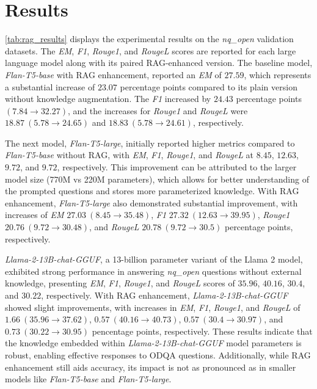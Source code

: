 \section{Results}



\cref{tab:rag_results} displays the experimental results on the \emph{nq\_open} validation datasets. The \emph{EM}, \emph{F1}, \emph{Rouge1}, and \emph{RougeL} scores are reported for each large language model along with its paired RAG-enhanced version. The baseline model, \emph{Flan-T5-base} with RAG enhancement, reported an \emph{EM} of $27.59$, which represents a substantial increase of $23.07$ percentage points compared to its plain version without knowledge augmentation. The \emph{F1} increased by $24.43$ percentage points $(7.84 \rightarrow 32.27)$, and the increases for \emph{Rouge1} and \emph{RougeL} were $18.87~(5.78 \rightarrow 24.65)$ and $18.83 ~(5.78 \rightarrow 24.61)$, respectively.

The next model, \emph{Flan-T5-large}, initially reported higher metrics compared to \emph{Flan-T5-base} without RAG, with \emph{EM}, \emph{F1}, \emph{Rouge1}, and \emph{RougeL} at $8.45$, $12.63$, $9.72$, and $9.72$, respectively. This improvement can be attributed to the larger model size (770M vs 220M parameters), which allows for better understanding of the prompted questions and stores more parameterized knowledge. With RAG enhancement, \emph{Flan-T5-large} also demonstrated substantial improvement, with increases of \emph{EM} $27.03~(8.45 \rightarrow 35.48)$, \emph{F1} $27.32~(12.63 \rightarrow 39.95)$, \emph{Rouge1} $20.76~(9.72 \rightarrow 30.48)$, and \emph{RougeL} $20.78~(9.72 \rightarrow 30.5)$ percentage points, respectively.

\emph{Llama-2-13B-chat-GGUF}, a 13-billion parameter variant of the Llama 2 model, exhibited strong performance in answering \emph{nq\_open} questions without external knowledge, presenting \emph{EM}, \emph{F1}, \emph{Rouge1}, and \emph{RougeL} scores of $35.96$, $40.16$, $30.4$, and $30.22$, respectively. With RAG enhancement, \emph{Llama-2-13B-chat-GGUF} showed slight improvements, with increases in \emph{EM}, \emph{F1}, \emph{Rouge1}, and \emph{RougeL} of $1.66~(35.96 \rightarrow 37.62)$, $0.57~(40.16 \rightarrow 40.73)$, $0.57~(30.4 \rightarrow 30.97)$, and $0.73~(30.22 \rightarrow 30.95)$ pencentage points, respectively. These results indicate that the knowledge embedded within \emph{Llama-2-13B-chat-GGUF} model parameters is robust, enabling effective responses to ODQA questions. Additionally, while RAG enhancement still aids accuracy, its impact is not as pronounced as in smaller models like \emph{Flan-T5-base} and \emph{Flan-T5-large}.

